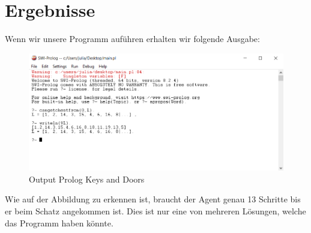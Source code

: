 \chapter{Ergebnisse}

Wenn wir unsere Programm auführen erhalten wir folgende Ausgabe:

\begin{figure}[h]
    \begin{center}
        \includegraphics[width=1\textwidth]{content/pictures/output.png}
        \caption{Output Prolog Keys and Doors}
        \label{fig:output}
    \end{center}
\end{figure}

\noindent
Wie auf der Abbildung zu erkennen ist, braucht der Agent genau 13 Schritte bis
er beim Schatz angekommen ist. Dies ist nur eine von mehreren Lösungen, welche 
das Programm haben könnte.